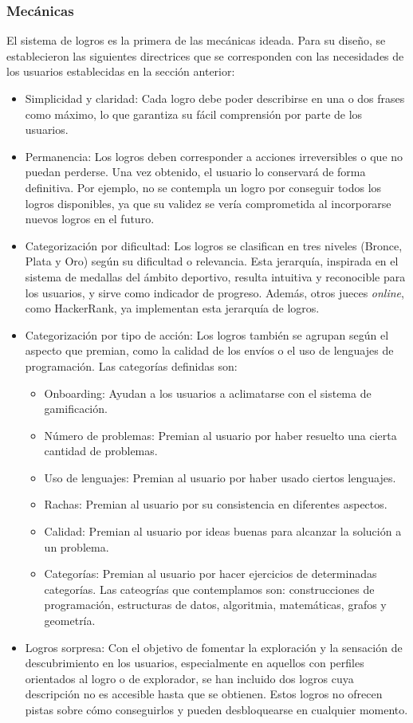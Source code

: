 \subsubsection{Mecánicas}

El sistema de logros es la primera de las mecánicas ideada. Para su diseño, se establecieron las siguientes directrices que se corresponden con las necesidades de los usuarios establecidas en la sección anterior: 
\begin{itemize}
    \item Simplicidad y claridad: Cada logro debe poder describirse en una o dos frases como máximo, lo que garantiza su fácil comprensión por parte de los usuarios.
    \item Permanencia: Los logros deben corresponder a acciones irreversibles o que no puedan perderse. Una vez obtenido, el usuario lo conservará de forma definitiva. Por ejemplo, no se contempla un logro por conseguir todos los logros disponibles, ya que su validez se vería comprometida al incorporarse nuevos logros en el futuro.
    \item Categorización por dificultad: Los logros se clasifican en tres niveles (Bronce, Plata y Oro) según su dificultad o relevancia. Esta jerarquía, inspirada en el sistema de medallas del ámbito deportivo, resulta intuitiva y reconocible para los usuarios, y sirve como indicador de progreso. Además, otros jueces \textit{online}, como HackerRank, ya implementan esta jerarquía de logros.
    \item Categorización por tipo de acción: Los logros también se agrupan según el aspecto que premian, como la calidad de los envíos o el uso de lenguajes de programación. Las categorías definidas son:
    \begin{itemize}
        \item Onboarding: Ayudan a los usuarios a aclimatarse con el sistema de gamificación.
        \item Número de problemas: Premian al usuario por haber resuelto una cierta cantidad de problemas.
        \item Uso de lenguajes: Premian al usuario por haber usado ciertos lenguajes.
        \item Rachas: Premian al usuario por su consistencia en diferentes aspectos.
        \item Calidad: Premian al usuario por ideas buenas para alcanzar la solución a un problema.
        \item Categorías: Premian al usuario por hacer ejercicios de determinadas categorías. Las cateogrías que contemplamos son: construcciones de programación, estructuras de datos, algoritmia, matemáticas, grafos y geometría. 
    \end{itemize}
    \item Logros sorpresa: Con el objetivo de fomentar la exploración y la sensación de descubrimiento en los usuarios, especialmente en aquellos con perfiles orientados al logro o de explorador, se han incluido dos logros cuya descripción no es accesible hasta que se obtienen. Estos logros no ofrecen pistas sobre cómo conseguirlos y pueden desbloquearse en cualquier momento.
\end{itemize}

